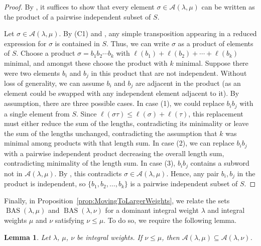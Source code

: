 \documentclass{amsart}
\newtheorem{lemma}[theorem]{Lemma}
\theoremstyle{definition}
\DeclareMathOperator{\BAS}{BAS}
\newcommand{\calA}{\mathcal{A}}
\begin{document}
\begin{proof}
    By , it suffices to show that every element $\sigma\in \calA(\lambda,\mu)$ can be written as the product of a pairwise independent subset of $S$.

    Let $\sigma\in \calA(\lambda,\mu)$. By (C1) and , any simple transposition appearing in a reduced expression for $\sigma$ is contained in $S$. Thus, we can write $\sigma$ as a product of elements of $S$. Choose a product $\sigma=b_1b_2\cdots b_k$ with $\ell(b_1)+\ell(b_2)+\cdots+\ell(b_k)$ minimal, and amongst these choose the product with $k$ minimal. Suppose there were two elements $b_i$ and $b_j$ in this product that are not independent. Without loss of generality, we can assume $b_i$ and $b_j$ are adjacent in the product (as an element could be swapped with any independent element adjacent to it). 
    By assumption, there are three possible cases. In case (1), we could replace $b_ib_j$ with a single element from $S$. Since $\ell(\sigma\tau)\leq\ell(\sigma)+\ell(\tau)$, this replacement must either reduce the sum of the lengths, contradicting its minimality or leave the sum of the lengths unchanged, contradicting the assumption that $k$ was minimal among products with that length sum. In case (2), we can replace $b_ib_j$ with a pairwise independent product decreasing the overall length sum, contradicting minimality of the length sum. In case (3), $b_ib_j$ contains a subword not in $\calA(\lambda,\mu)$. By , this contradicts $\sigma\in \calA(\lambda,\mu)$. Hence, any pair $b_i, b_j$ in the product is independent, so $\{b_1,b_2,\ldots,b_k\}$ is a pairwise independent subset of $S$.
\end{proof}



Finally, in Proposition~\ref{prop:MovingToLargerWeights}, we relate the sets $\BAS(\lambda,\mu)$ and $\BAS(\lambda,\nu)$ for a dominant integral weight $\lambda$ and integral weights $\mu$ and $\nu$ satisfying $\nu\leq\mu$. To do so, we require the following lemma.

\begin{lemma}\label{lem:ContainmentsOfAltSets}
    Let $\lambda$, $\mu$, $\nu$ be integral weights. If $\nu\leq\mu$, then $\mathcal{A}(\lambda,\mu)\subseteq \mathcal{A}(\lambda,\nu)$.
\end{lemma}
\end{document}
